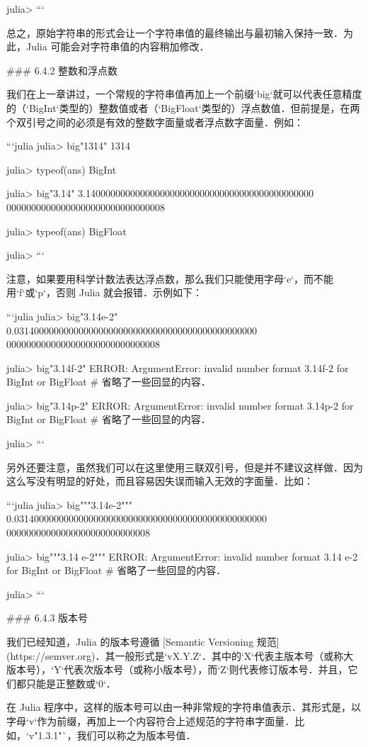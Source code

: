 julia> 
```

总之，原始字符串的形式会让一个字符串值的最终输出与最初输入保持一致．为此，Julia 可能会对字符串值的内容稍加修改．

### 6.4.2 整数和浮点数

我们在上一章讲过，一个常规的字符串值再加上一个前缀`big`就可以代表任意精度的（`BigInt`类型的）整数值或者（`BigFloat`类型的）浮点数值．但前提是，在两个双引号之间的必须是有效的整数字面量或者浮点数字面量．例如：

```julia
julia> big"1314"
1314

julia> typeof(ans)
BigInt

julia> big"3.14"
3.1400000000000000000000000000000000000000000000
  00000000000000000000000000000008

julia> typeof(ans)
BigFloat

julia> 
```

注意，如果要用科学计数法表达浮点数，那么我们只能使用字母`e`，而不能用`f`或`p`，否则 Julia 就会报错．示例如下：

```julia
julia> big"3.14e-2"
0.0314000000000000000000000000000000000000000000000
  0000000000000000000000000000008

julia> big"3.14f-2"
ERROR: ArgumentError: invalid number format 3.14f-2 for BigInt or BigFloat
# 省略了一些回显的内容．

julia> big"3.14p-2"
ERROR: ArgumentError: invalid number format 3.14p-2 for BigInt or BigFloat
# 省略了一些回显的内容．

julia> 
```

另外还要注意，虽然我们可以在这里使用三联双引号，但是并不建议这样做．因为这么写没有明显的好处，而且容易因失误而输入无效的字面量．比如：

```julia
julia> big"""3.14e-2"""
0.031400000000000000000000000000000000000000000000000
  00000000000000000000000000008

julia> big"""3.14
       e-2"""
ERROR: ArgumentError: invalid number format 3.14
e-2 for BigInt or BigFloat
# 省略了一些回显的内容．

julia> 
```

### 6.4.3 版本号

我们已经知道，Julia 的版本号遵循 [Semantic Versioning 规范](https://semver.org)．其一般形式是`vX.Y.Z`．其中的`X`代表主版本号（或称大版本号），`Y`代表次版本号（或称小版本号），而`Z`则代表修订版本号．并且，它们都只能是正整数或`0`．

在 Julia 程序中，这样的版本号可以由一种非常规的字符串值表示．其形式是，以字母`v`作为前缀，再加上一个内容符合上述规范的字符串字面量．比如，`v"1.3.1"`，我们可以称之为版本号值．

